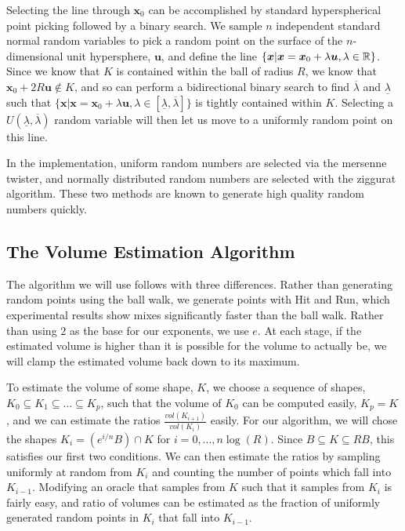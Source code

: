 Selecting the line through $\bm{x}_0$ can be accomplished by standard hyperspherical point picking %
followed by a binary search. We sample $n$ independent standard normal random variables to pick a random point on the surface of the $n$-dimensional unit hypersphere, $\bm{u}$, and define the line $\{\bm{x} | \bm{x} = \bm{x}_0 + \lambda \bm{u}, \lambda \in \mathbb{R} \}$. Since we know that $K$ is contained within the ball of radius $R$, we know that $\bm{x}_0 + 2R\bm{u} \notin K$, and so can perform a bidirectional binary search to find $\overline{\lambda}$ and $\underline{\lambda}$ such that $\{\bm{x} | \bm{x} = \bm{x}_0 + \lambda \bm{u}, \lambda \in [\underline{\lambda}, \overline{\lambda}] \}$ is tightly contained within $K$. Selecting a $U(\underline{\lambda}, \overline{\lambda})$ random variable will then let us move to a uniformly random point on this line.

In the implementation, uniform random numbers are selected via the mersenne twister, and normally distributed random numbers are selected with the ziggurat algorithm. These two methods are known to generate high quality random numbers quickly.

\subsection{The Volume Estimation Algorithm}

The algorithm we will use follows %
with three differences. Rather than generating random points using the ball walk, we generate points with Hit and Run, which experimental results show mixes significantly faster than the ball walk. Rather than using $2$ as the base for our exponents, we use $e$. At each stage, if the estimated volume is higher than it is possible for the volume to actually be, we will clamp the estimated volume back down to its maximum.

To estimate the volume of some shape, $K$, we choose a sequence of shapes, $K_0 \subseteq K_1 \subseteq ... \subseteq K_p$, such that the volume of $K_0$ can be computed easily, $K_p = K$, and we can estimate the ratios $\frac{vol(K_{i+1})}{vol(K_i)}$ easily. For our algorithm, we will chose the shapes $K_i = (e^{i/n}B) \cap K$ for $i = 0, ..., n \log (R)$. Since $B \subseteq K \subseteq RB$, this satisfies our first two conditions. We can then estimate the ratios by sampling uniformly at random from $K_i$ and counting the number of points which fall into $K_{i-1}$. Modifying an oracle that samples from $K$ such that it samples from $K_i$ is fairly easy, and ratio of volumes can be estimated as the fraction of uniformly generated random points in $K_i$ that fall into $K_{i-1}$.